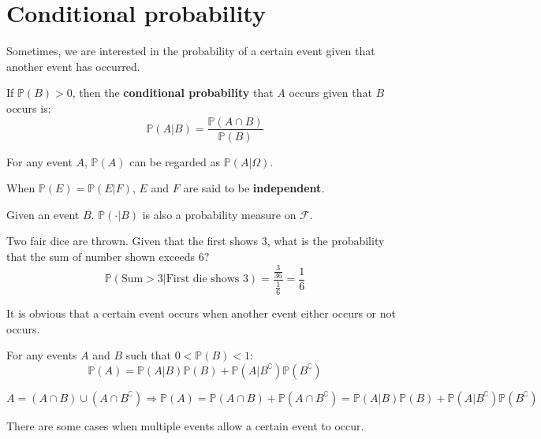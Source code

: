\documentclass{huhtakm-template-book}
\newcommand{\prob}{\mathbb{P}}
\begin{document}
\section{Conditional probability}
    Sometimes, we are interested in the probability of a certain event given that another event has occurred.
    \begin{defn} %
        If $\prob(B)>0$, then the \textbf{conditional probability} that $A$ occurs given that $B$ occurs is:
        \begin{equation*}
            \prob(A|B)=\frac{\prob(A\cap B)}{\prob(B)}
        \end{equation*}
    \end{defn}
    \begin{rem}
        For any event $A$, $\prob(A)$ can be regarded as $\prob(A|\Omega)$.
    \end{rem}
    \begin{rem}
        When $\prob(E)=\prob(E|F)$, $E$ and $F$ are said to be \textbf{independent}.
    \end{rem}
    \begin{rem}
        Given an event $B$. $\prob(\cdot |B)$ is also a probability measure on $\mathcal{F}$.
    \end{rem}
    \begin{eg}
        Two fair dice are thrown. Given that the first shows $3$, what is the probability that the sum of number shown exceeds $6$?
        \begin{equation*}
            \prob(\text{Sum}>3|\text{First die shows }3)=\frac{\frac{3}{36}}{\frac{1}{6}}=\frac{1}{6}
        \end{equation*}
    \end{eg}
    It is obvious that a certain event occurs when another event either occurs or not occurs.
    \begin{lem}
        For any events $A$ and $B$ such that $0<\prob(B)<1$:
        \begin{equation*}
            \prob(A)=\prob(A|B)\prob(B)+\prob(A|B^{\complement})\prob(B^{\complement})
        \end{equation*}
    \end{lem}
    \begin{proofing}
        $A=(A\cap B)\cup(A\cap B^{\complement})\Longrightarrow\prob(A)=\prob(A\cap B)+\prob(A\cap B^{\complement})=\prob(A|B)\prob(B)+\prob(A|B^{\complement})\prob(B^{\complement})$
    \end{proofing}
    There are some cases when multiple events allow a certain event to occur.
\end{document}
